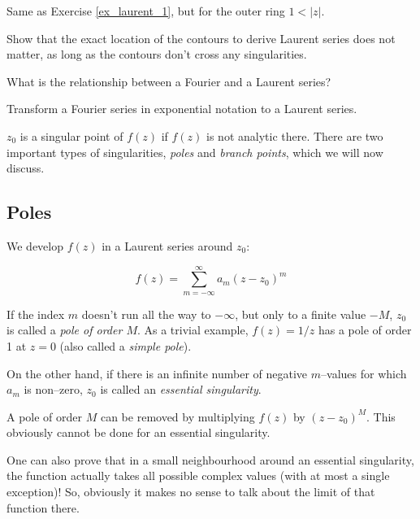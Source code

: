 \begin{exer}
Same as Exercise \ref{ex_laurent_1}, but for the outer ring  $1 < | z |$.
\end{exer}

\begin{exer}
Show that the exact location of the contours to derive Laurent series does not matter, as long as the contours don't cross any singularities.
\end{exer}

\begin{exer}
  
  What is the relationship between a Fourier and a Laurent series?

  \begin{hnt}
  Transform a Fourier series in exponential notation to a Laurent series.
  \end{hnt}
    
\end{exer}



$z_0$ is a singular point of $f(z)$ if $f(z)$ is not analytic there. There are two important types of singularities, \emph{poles} and \emph{branch points}, which we will now discuss.

\subsection*{Poles}

We develop $f(z)$ in a Laurent series around $z_0$:

\begin{equation}
f(z)= \sum_{m=-\infty}^{\infty} a_m (z-z_0)^m
\end{equation} 

If the index $m$ doesn't run all the way to $-\infty$, but only to a finite value $-M$, $z_0$ is called a \emph{pole of order $M$}. As a trivial example, $f(z)=1/z$ has a pole of order 1 at $z=0$ (also called a \emph{simple pole}).

On the other hand, if there is an infinite number of negative $m$--values for which $a_m$ is non--zero, $z_0$ is called an \emph{essential singularity}.

A pole of order $M$ can be removed by multiplying $f(z)$ by $(z-z_0)^M$. This obviously cannot be done for an essential singularity.

\noindent{}One can also prove that in a small neighbourhood around an essential singularity, the function actually takes all possible complex values (with at most a single exception)! So, obviously it makes no sense to talk about the limit of that function there.

